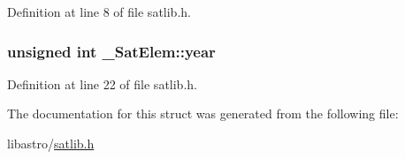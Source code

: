 Definition at line 8 of file satlib.\-h.

\hypertarget{struct___sat_elem_a203379207f7fc2daca8632f639950974}{
\subsubsection[{year}]{\setlength{\rightskip}{0pt plus 5cm}unsigned int \-\_\-\-Sat\-Elem\-::year}}\label{struct___sat_elem_a203379207f7fc2daca8632f639950974}


Definition at line 22 of file satlib.\-h.



The documentation for this struct was generated from the following file\-:\begin{DoxyCompactItemize}
\item 
libastro/\hyperlink{satlib_8h}{satlib.\-h}\end{DoxyCompactItemize}
